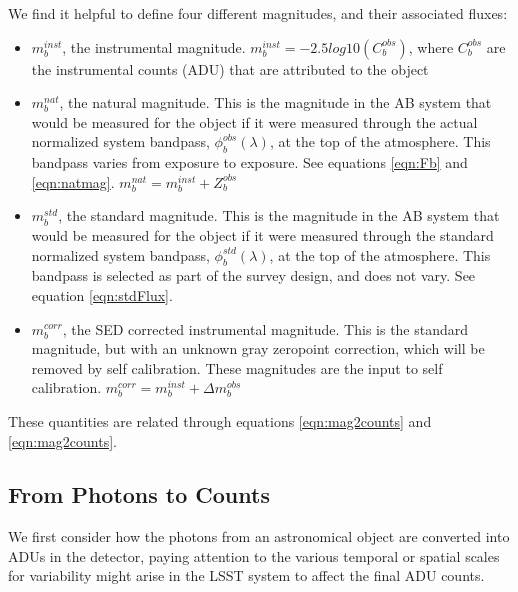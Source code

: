 \documentclass[12pt,preprint]{aastex}
\begin{document}
\begin{boxedminipage}{7in}
We find it helpful to define four different magnitudes, and their associated fluxes:
\begin{itemize}
\item{$m_b^{inst}$, the instrumental magnitude.  $m_b^{inst} = -2.5 log10(C_b^{obs})$, where $C_b^{obs}$ are the instrumental counts (ADU) that are attributed to the object}
\item{$m_b^{nat}$, the natural magnitude.  This is the magnitude in the AB system that would be measured for the object if it were measured through the actual normalized system bandpass, $\phi_b^{obs}(\lambda)$, at the top of the atmosphere.  This bandpass varies
from exposure to exposure.  See equations \ref{eqn:Fb} and \ref{eqn:natmag}. $m_b^{nat} = m_b^{inst} + Z_b^{obs}$}
\item{$m_b^{std}$}, the standard magnitude.  This is the magnitude in the AB system that would be measured for the object if it were measured through the standard normalized system bandpass, $\phi_b^{std}(\lambda)$, at the top of the atmosphere.  This bandpass is 
selected as part of the survey design, and does not vary.  See equation \ref{eqn:stdFlux}. 
\item{$m_b^{corr}$, the SED corrected instrumental magnitude.  This is the standard magnitude, but with an unknown gray zeropoint correction, which will be removed by self calibration.  These magnitudes are the input to self calibration. $m_b^{corr} = m_b^{inst} + \Delta m_b^{obs}$}
\end{itemize}
These quantities are related through equations \ref{eqn:mag2counts} and \ref{eqn:mag2counts}.
\end{boxedminipage}

\subsection{From Photons to Counts}

We first consider how the photons from an astronomical object are
converted into ADUs in the detector, paying attention to the various
temporal or spatial scales for variability might arise in the LSST
system to affect the final ADU counts. 
\end{document}
